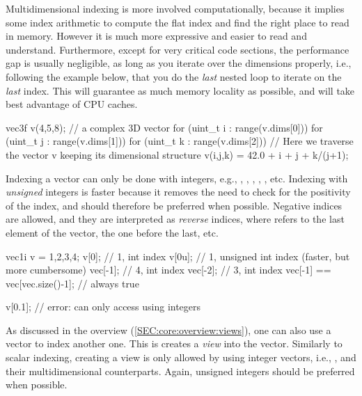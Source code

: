 \documentclass[12pt,a4paper]{report}
\newenvironment{example}
{
    \begin{mdframed}[style=example,frametitle={Example}]
}
{
    \end{mdframed}
}
\begin{document}
Multidimensional indexing is more involved computationally, because it implies some index arithmetic to compute the flat index and find the right place to read in memory. However it is much more expressive and easier to read and understand. Furthermore, except for very critical code sections, the performance gap is usually negligible, as long as you iterate over the dimensions properly, i.e., following the example below, that you do the \emph{last} nested loop to iterate on the \emph{last} index. This will guarantee as much memory locality as possible, and will take best advantage of CPU caches.

\begin{example}
\begin{cppcode}
vec3f v(4,5,8); // a complex 3D vector
for (uint_t i : range(v.dims[0]))
for (uint_t j : range(v.dims[1]))
for (uint_t k : range(v.dims[2])) {
    // Here we traverse the vector v keeping its dimensional structure
    v(i,j,k) = 42.0 + i + j + k/(j+1);
}
\end{cppcode}
\end{example}

Indexing a vector can only be done with integers, e.g., , , , , , etc. Indexing with \emph{unsigned} integers is faster because it removes the need to check for the positivity of the index, and should therefore be preferred when possible. Negative indices are allowed, and they are interpreted as \emph{reverse} indices, where  refers to the last element of the vector,  the one before the last, etc.

\begin{example}
\begin{cppcode}
vec1i v = {1,2,3,4};
v[0];    // 1, int index
v[0u];   // 1, unsigned int index (faster, but more cumbersome)
vec[-1]; // 4, int index
vec[-2]; // 3, int index
vec[-1] == vec[vec.size()-1]; // always true

v[0.1]; // error: can only access using integers
\end{cppcode}
\end{example}

As discussed in the overview (\ref{SEC:core:overview:views}), one can also use a vector to index another one. This is creates a \emph{view} into the vector. Similarly to scalar indexing, creating a view is only allowed by using integer vectors, i.e., ,  and their multidimensional counterparts. Again, unsigned integers should be preferred when possible.
\end{document}
